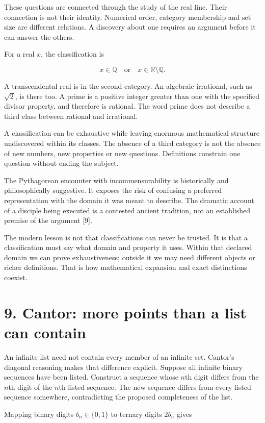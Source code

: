 \documentclass[10pt]{article}
\begin{document}
These questions are connected through the study of the real line. Their connection is not their identity. Numerical order, category membership and set size are different relations. A discovery about one requires an argument before it can answer the others.

For a real $x$, the classification is

\[
x\in\mathbb Q\quad\text{or}\quad x\in\mathbb R\setminus\mathbb Q.
\]

A transcendental real is in the second category. An algebraic irrational, such as $\sqrt2$, is there too. A prime is a positive integer greater than one with the specified divisor property, and therefore is rational. The word prime does not describe a third class between rational and irrational.

A classification can be exhaustive while leaving enormous mathematical structure undiscovered within its classes. The absence of a third category is not the absence of new numbers, new properties or new questions. Definitions constrain one question without ending the subject.

The Pythagorean encounter with incommensurability is historically and philosophically suggestive. It exposes the risk of confusing a preferred representation with the domain it was meant to describe. The dramatic account of a disciple being executed is a contested ancient tradition, not an established premise of the argument [9].

The modern lesson is not that classifications can never be trusted. It is that a classification must say what domain and property it uses. Within that declared domain we can prove exhaustiveness; outside it we may need different objects or richer definitions. That is how mathematical expansion and exact distinctions coexist.

\clearpage
\section*{9. Cantor: more points than a list can contain}
An infinite list need not contain every member of an infinite set. Cantor's diagonal reasoning makes that difference explicit. Suppose all infinite binary sequences have been listed. Construct a sequence whose $n$th digit differs from the $n$th digit of the $n$th listed sequence. The new sequence differs from every listed sequence somewhere, contradicting the proposed completeness of the list.

Mapping binary digits $b_n\in\{0,1\}$ to ternary digits $2b_n$ gives
\end{document}
